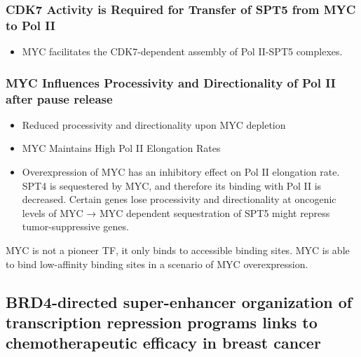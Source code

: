 \hypertarget{cdk7-activity-is-required-for-transfer-of-spt5-from-myc-to-pol-ii}{%
\subsubsection{CDK7 Activity is Required for Transfer of SPT5 from MYC
to Pol
II}\label{cdk7-activity-is-required-for-transfer-of-spt5-from-myc-to-pol-ii}}

\begin{itemize}
\tightlist
\item
  MYC facilitates the CDK7-dependent assembly of Pol II-SPT5 complexes.
\end{itemize}

\hypertarget{myc-influences-processivity-and-directionality-of-pol-ii-after-pause-release}{%
\subsubsection{MYC Influences Processivity and Directionality of Pol II
after pause
release}\label{myc-influences-processivity-and-directionality-of-pol-ii-after-pause-release}}

\begin{itemize}
\tightlist
\item
  Reduced processivity and directionality upon MYC depletion
\item
  MYC Maintains High Pol II Elongation Rates
\item
  Overexpression of MYC has an inhibitory effect on Pol II elongation
  rate. SPT4 is sequestered by MYC, and therefore its binding with Pol
  II is decreased. Certain genes lose processivity and directionality at
  oncogenic levels of MYC → MYC dependent sequestration of SPT5 might
  repress tumor-suppressive genes.
\end{itemize}

MYC is not a pioneer TF, it only binds to accessible binding sites. MYC
is able to bind low-affinity binding sites in a scenario of MYC
overexpression.

\hypertarget{brd4-directed-super-enhancer-organization-of-transcription-repression-programs-links-to-chemotherapeutic-efficacy-in-breast-cancer}{%
\subsection{BRD4-directed super-enhancer organization of transcription
repression programs links to chemotherapeutic efficacy in breast
cancer}\label{brd4-directed-super-enhancer-organization-of-transcription-repression-programs-links-to-chemotherapeutic-efficacy-in-breast-cancer}}

